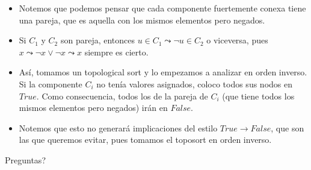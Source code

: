 \documentclass[compress]{beamer}
\begin{document}
\begin{frame}
\begin{itemize}
\item Notemos que podemos pensar que cada componente fuertemente conexa 
tiene una pareja, que es aquella con los mismos elementos pero negados.
\item Si $C_1$ y $C_2$ son pareja, entonces $u \in C_1 \leadsto \lnot u \in C_2$ o
viceversa, pues $x \leadsto \lnot x \lor \lnot x \leadsto x$ siempre
es cierto.
\item Así, tomamos un topological sort y lo empezamos a analizar en
orden inverso. Si la componente $C_i$ no tenía valores asignados, coloco
todos sus nodos en $True$. Como consecuencia, todos los de la pareja de $C_i$
(que tiene todos los mismos elementos pero negados) irán en $False$.
\item Notemos que esto no generará implicaciones del estilo $True \rightarrow False$,
que son las que queremos evitar, pues tomamos el toposort en orden inverso.
\end{itemize}
\end{frame}

\begin{frame}
\begin{center}
{\Huge \textquestiondown Preguntas?}
\end{center}
\end{frame}
\end{document}
